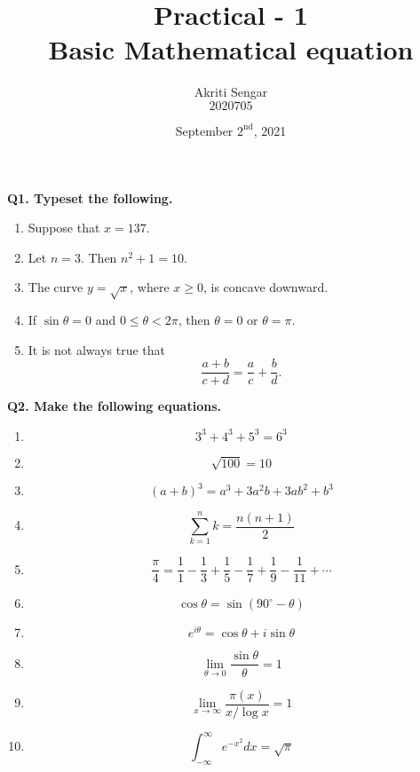 \documentclass{article}
\title{\textbf{Practical - 1} \\ Basic Mathematical equation}
\author{Akriti Sengar \\ $2020705$}
\date{September $2^{\text{nd}}$, 2021}
\begin{document}
	\maketitle
	
	\noindent \textbf{Q1. Typeset the following.}
	\begin{enumerate}
		\item Suppose that $x=137$.
		\item Let $n=3.$ Then $n^2+1=10$.
		\item The curve $y=\sqrt{x}$, where $x \geq 0$, is concave downward.
		\item If $\sin \theta=0$ and $0 \leq \theta < 2\pi$, then $\theta=0$ or $\theta=\pi$.
		\item It is not always true that \\ \[\frac{a+b}{c+d}=\frac{a}{c}+\frac{b}{d}.\]
	\end{enumerate}
	
	\noindent \textbf{Q2. Make the following equations.}
	\begin{enumerate}
		\item \[3^3+4^3+5^3=6^3\]
		\item \[\sqrt{100}=10\]
		\item \[(a+b)^3=a^3+3a^2b+3ab^2+b^3\]
		\item \[\sum\limits_{k=1}^{n} k=\frac{n(n+1)}{2}\]
		\item \[\frac{\pi}{4}=\frac{1}{1}-\frac{1}{3}+\frac{1}{5}-\frac{1}{7}+\frac{1}{9}-\frac{1}{11}+\cdots\]
		\item \[\cos \theta=\sin(90^\circ-\theta)\]
		\item \[e^{i \theta}=\cos \theta+i \sin \theta\]
		\item \[\lim\limits_{\theta \to 0} \frac{\sin \theta}{\theta}=1\]
		\item \[\lim\limits_{x \to \infty} \frac{\pi (x)}{x/\log x}=1\]
		\item \[\int_{-\infty}^{\infty} e^{-x^2} dx=\sqrt{\pi}\]
	\end{enumerate}
	
\end{document}
